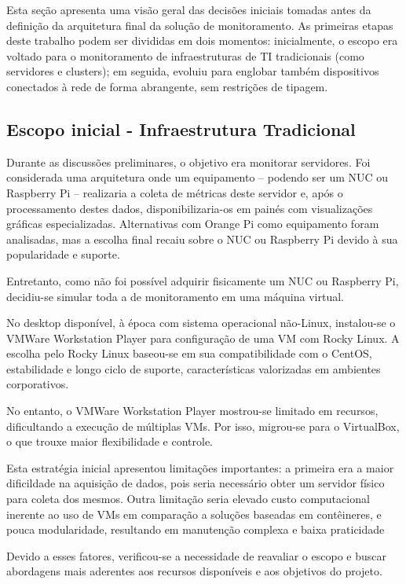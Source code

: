 {Esta seção apresenta uma visão geral das decisões iniciais tomadas antes da definição da arquitetura final da solução de monitoramento. As primeiras etapas deste trabalho podem ser divididas em dois momentos: inicialmente, o escopo era voltado para o monitoramento de infraestruturas de TI tradicionais (como servidores e clusters); em seguida, evoluiu para englobar também dispositivos conectados à rede de forma abrangente, sem restrições de tipagem.

\subsection{Escopo inicial - Infraestrutura Tradicional}
\label{subsection:EscopoInicial}

Durante as discussões preliminares, o objetivo era monitorar servidores. Foi considerada uma arquitetura onde um equipamento -- podendo ser um NUC ou Raspberry Pi -- realizaria a coleta de métricas deste servidor e, após o processamento destes dados, disponibilizaria-os em painés com visualizações gráficas especializadas. Alternativas com Orange Pi como equipamento foram analisadas, mas a escolha final recaiu sobre o NUC ou Raspberry Pi devido à sua popularidade e suporte.

Entretanto, como não foi possível adquirir fisicamente um NUC ou Raspberry Pi, decidiu-se simular toda a  de monitoramento em uma máquina virtual.

No desktop disponível, à época com sistema operacional não-Linux, instalou-se o VMWare Workstation Player para configuração de uma VM com Rocky Linux. A escolha pelo Rocky Linux baseou-se em sua compatibilidade com o CentOS, estabilidade e longo ciclo de suporte, características valorizadas em ambientes corporativos.

No entanto, o VMWare Workstation Player mostrou-se limitado em recursos, dificultando a execução de múltiplas VMs. Por isso, migrou-se para o VirtualBox, o que trouxe maior flexibilidade e controle.

Esta estratégia inicial apresentou limitações importantes: a primeira era a maior dificildade na aquisição de dados, pois seria necessário obter um servidor físico para coleta dos mesmos. Outra limitação seria elevado custo computacional inerente ao uso de VMs em comparação a soluções baseadas em contêineres, e pouca modularidade, resultando em manutenção complexa e baixa praticidade

Devido a esses fatores, verificou-se a necessidade de reavaliar o escopo e buscar abordagens mais aderentes aos recursos disponíveis e aos objetivos do projeto.


}
